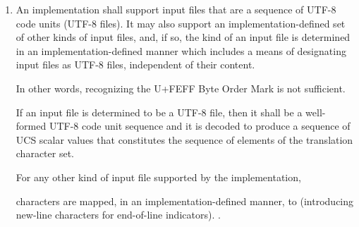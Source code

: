 \documentclass{wg21}
\begin{document}
\begin{enumerate}

    
\item

\begin{addedblock}
%
%    
%    

An implementation shall support input files that are a sequence of UTF-8 code units (UTF-8 files). It may also support an implementation-defined set of other kinds of input files, and, if so, the kind of an input file is determined in an implementation-defined manner which includes a means of designating input files as UTF-8 files, independent of their content. \begin{note}In other words, recognizing the U+FEFF Byte Order Mark is not sufficient.\end{note}

If an input file is determined to be a UTF-8 file, then it shall be a well-formed UTF-8 code unit sequence and it is decoded to produce a sequence of UCS scalar values that constitutes the sequence of elements of the translation character set.

For any other kind of input file supported by the implementation, \end{addedblock}
 characters are mapped, in an
implementation-defined manner, to  (introducing new-line characters for end-of-line
indicators).
.


\end{enumerate}
\end{document}
